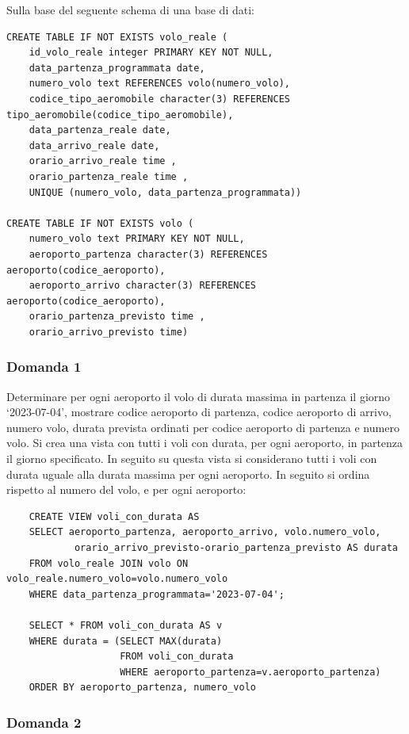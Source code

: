 \documentclass{article}
\begin{document}
Sulla base del seguente schema di una base di dati:
\begin{verbatim}
CREATE TABLE IF NOT EXISTS volo_reale (
    id_volo_reale integer PRIMARY KEY NOT NULL,
    data_partenza_programmata date,
    numero_volo text REFERENCES volo(numero_volo),
    codice_tipo_aeromobile character(3) REFERENCES tipo_aeromobile(codice_tipo_aeromobile),
    data_partenza_reale date,
    data_arrivo_reale date,
    orario_arrivo_reale time ,
    orario_partenza_reale time ,
    UNIQUE (numero_volo, data_partenza_programmata))

CREATE TABLE IF NOT EXISTS volo (
    numero_volo text PRIMARY KEY NOT NULL,
    aeroporto_partenza character(3) REFERENCES aeroporto(codice_aeroporto),
    aeroporto_arrivo character(3) REFERENCES aeroporto(codice_aeroporto),
    orario_partenza_previsto time ,
    orario_arrivo_previsto time)
\end{verbatim}

\subsubsection*{Domanda 1}

Determinare per ogni aeroporto il volo di durata massima in partenza il giorno `2023-07-04', mostrare codice aeroporto di partenza, codice aeroporto di arrivo, 
numero volo, durata prevista ordinati per codice aeroporto di partenza e numero volo. Si crea una vista con tutti i voli con durata, per ogni aeroporto, in partenza 
il giorno specificato. In seguito su questa vista si considerano tutti i voli con durata uguale alla durata massima per ogni aeroporto. In seguito si ordina rispetto 
al numero del volo, e per ogni aeroporto:


\begin{verbatim}
    CREATE VIEW voli_con_durata AS
    SELECT aeroporto_partenza, aeroporto_arrivo, volo.numero_volo, 
            orario_arrivo_previsto-orario_partenza_previsto AS durata
    FROM volo_reale JOIN volo ON volo_reale.numero_volo=volo.numero_volo
    WHERE data_partenza_programmata='2023-07-04';

    SELECT * FROM voli_con_durata AS v 
    WHERE durata = (SELECT MAX(durata)
                    FROM voli_con_durata
                    WHERE aeroporto_partenza=v.aeroporto_partenza)
    ORDER BY aeroporto_partenza, numero_volo
\end{verbatim}

\subsubsection*{Domanda 2}
\end{document}
